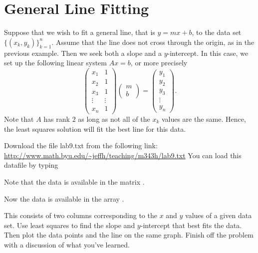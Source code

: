 \section*{General Line Fitting}

Suppose that we wish to fit a general line, that is $y=m x+b$, to the data set $\{(x_k,y_k)\}^n_{k=1}$.  Assume that the line does not cross through the origin, as in the previous example.  Then we seek both a slope and a $y$-intercept.  In this case, we set up the following linear system $A x = b$, or more precisely
\[
\begin{pmatrix}
x_1 & 1\\
x_2 & 1\\
x_3 & 1\\
\vdots & \vdots\\
x_n & 1
\end{pmatrix}
\begin{pmatrix}
m\\
b
\end{pmatrix}=
\begin{pmatrix}
y_1\\
y_2\\
y_3\\
\vdots\\
y_n
\end{pmatrix}.
\]
Note that $A$ has rank $2$ as long as not all of the $x_k$ values are the same.  Hence, the least squares solution will fit the best line for this data.


\begin{problem}
Download the file lab9.txt from the following link:
\url{http://www.math.byu.edu/~jeffh/teaching/m343h/lab9.txt}
You can load this datafile by typing
\begin{matlab}
Note that the data is available in the matrix .
\end{matlab}
\begin{python}
Now the data is available in the array .
\end{python}
This consists of two columns corresponding to the $x$ and $y$ values of a given data set.  Use least squares to find the slope and $y$-intercept that best fits the data.  Then plot the data points and the line on the same graph.  Finish off the problem with a discussion of what you've learned.
\end{problem}
